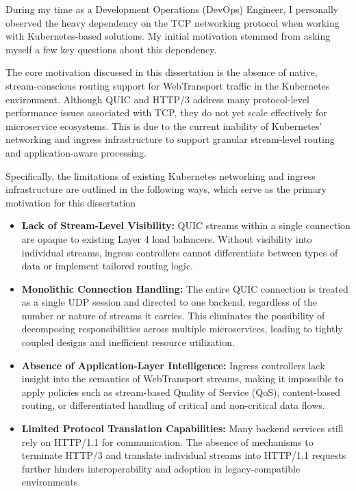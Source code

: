 During my time as a Development Operations (DevOps) Engineer, I personally observed the heavy dependency on the TCP networking protocol when working with Kubernetes-based solutions. My initial motivation stemmed from asking myself a few key questions about this dependency.

The core motivation discussed in this dissertation is the absence of native, stream-conscious routing support for WebTransport traffic in the Kubernetes environment. Although QUIC and HTTP/3 address many protocol-level performance issues associated with TCP, they do not yet scale effectively for microservice ecosystems. This is due to the current inability of Kubernetes’ networking and ingress infrastructure to support granular stream-level routing and application-aware processing.

Specifically, the limitations of existing Kubernetes networking and ingress infrastructure are outlined in the following ways, which serve as the primary motivation for this dissertation

\begin{itemize}
\item \textbf{Lack of Stream-Level Visibility:} QUIC streams within a single connection are opaque to existing Layer 4 load balancers. Without visibility into individual streams, ingress controllers cannot differentiate between types of data or implement tailored routing logic.

\item \textbf{Monolithic Connection Handling:} The entire QUIC connection is treated as a single UDP session and directed to one backend, regardless of the number or nature of streams it carries. This eliminates the possibility of decomposing responsibilities across multiple microservices, leading to tightly coupled designs and inefficient resource utilization.

\item \textbf{Absence of Application-Layer Intelligence:} Ingress controllers lack insight into the semantics of WebTransport streams, making it impossible to apply policies such as stream-based Quality of Service (QoS), content-based routing, or differentiated handling of critical and non-critical data flows.

\item \textbf{Limited Protocol Translation Capabilities:} Many backend services still rely on HTTP/1.1 for communication. The absence of mechanisms to terminate HTTP/3 and translate individual streams into HTTP/1.1 requests further hinders interoperability and adoption in legacy-compatible environments.


\end{itemize}

